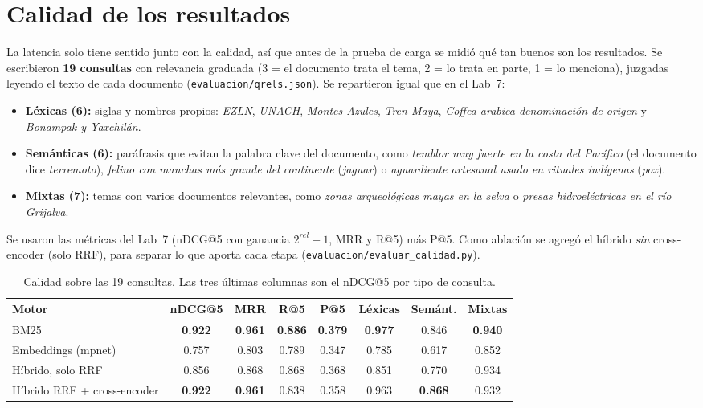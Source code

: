 \documentclass[11pt,letterpaper]{article}
\newcommand{\term}[1]{\texttt{#1}}
\begin{document}
\section{Calidad de los resultados}
\label{sec:calidad}

La latencia solo tiene sentido junto con la calidad, así que antes de la prueba de carga se midió qué tan buenos son los resultados. Se escribieron \textbf{19 consultas} con relevancia graduada (3 = el documento trata el tema, 2 = lo trata en parte, 1 = lo menciona), juzgadas leyendo el texto de cada documento (\term{evaluacion/qrels.json}). Se repartieron igual que en el Lab~7:
\begin{itemize}[nosep]
\item \textbf{Léxicas (6):} siglas y nombres propios: \emph{EZLN}, \emph{UNACH}, \emph{Montes Azules}, \emph{Tren Maya}, \emph{Coffea arabica denominación de origen} y \emph{Bonampak y Yaxchilán}.
\item \textbf{Semánticas (6):} paráfrasis que evitan la palabra clave del documento, como \emph{temblor muy fuerte en la costa del Pacífico} (el documento dice \emph{terremoto}), \emph{felino con manchas más grande del continente} (\emph{jaguar}) o \emph{aguardiente artesanal usado en rituales indígenas} (\emph{pox}).
\item \textbf{Mixtas (7):} temas con varios documentos relevantes, como \emph{zonas arqueológicas mayas en la selva} o \emph{presas hidroeléctricas en el río Grijalva}.
\end{itemize}
Se usaron las métricas del Lab~7 (nDCG@5 con ganancia $2^{rel}-1$, MRR y R@5) más P@5. Como ablación se agregó el híbrido \emph{sin} cross-encoder (solo RRF), para separar lo que aporta cada etapa (\term{evaluacion/evaluar\_calidad.py}).

\begin{table}[H]
\centering
\caption{Calidad sobre las 19 consultas. Las tres últimas columnas son el nDCG@5 por tipo de consulta.}
\label{tab:calidad}
\begin{tabular}{lccccccc}
\toprule
Motor & nDCG@5 & MRR & R@5 & P@5 & Léxicas & Semánt. & Mixtas \\
\midrule
BM25 & \textbf{0.922} & \textbf{0.961} & \textbf{0.886} & \textbf{0.379} & \textbf{0.977} & 0.846 & \textbf{0.940} \\
Embeddings (mpnet) & 0.757 & 0.803 & 0.789 & 0.347 & 0.785 & 0.617 & 0.852 \\
\midrule
\textcolor{gris}{Híbrido, solo RRF} & \textcolor{gris}{0.856} & \textcolor{gris}{0.868} & \textcolor{gris}{0.868} & \textcolor{gris}{0.368} & \textcolor{gris}{0.851} & \textcolor{gris}{0.770} & \textcolor{gris}{0.934} \\
Híbrido RRF + cross-encoder & \textbf{0.922} & \textbf{0.961} & 0.838 & 0.358 & 0.963 & \textbf{0.868} & 0.932 \\
\bottomrule
\end{tabular}
\end{table}
\end{document}
